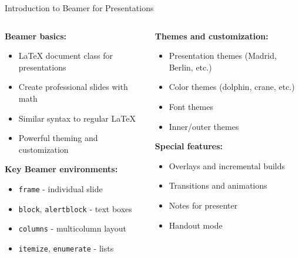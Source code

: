      \begin{frame}{Introduction to Beamer for Presentations}
          \begin{columns}
               \begin{column}{0.5\textwidth}
                    \textbf{Beamer basics:}
                    \begin{itemize}
                         \item LaTeX document class for presentations
                         \item Create professional slides with math
                         \item Similar syntax to regular LaTeX
                         \item Powerful theming and customization
                    \end{itemize}
                    
                    \textbf{Key Beamer environments:}
                    \begin{itemize}
                         \item \texttt{frame} - individual slide
                         \item \texttt{block}, \texttt{alertblock} - text boxes
                         \item \texttt{columns} - multicolumn layout
                         \item \texttt{itemize}, \texttt{enumerate} - lists
                    \end{itemize}
               \end{column}
               
               \begin{column}{0.5\textwidth}
                    \textbf{Themes and customization:}
                    \begin{itemize}
                         \item Presentation themes (Madrid, Berlin, etc.)
                         \item Color themes (dolphin, crane, etc.)
                         \item Font themes
                         \item Inner/outer themes
                    \end{itemize}
                    
                    \textbf{Special features:}
                    \begin{itemize}
                         \item Overlays and incremental builds
                         \item Transitions and animations
                         \item Notes for presenter
                         \item Handout mode
                    \end{itemize}
               \end{column}
          \end{columns}
          

\end{frame}
